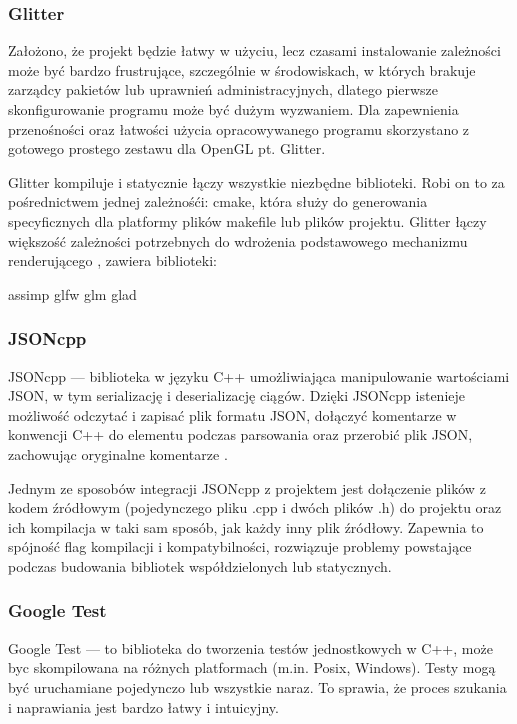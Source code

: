 \subsubsection{Glitter}
Założono, że projekt będzie łatwy w użyciu, lecz czasami instalowanie zależności może być bardzo frustrujące, szczególnie w środowiskach, w których brakuje zarządcy pakietów lub uprawnień administracyjnych, dlatego pierwsze skonfigurowanie programu może być dużym wyzwaniem. Dla zapewnienia przenośności oraz łatwości użycia opracowywanego programu skorzystano z gotowego prostego zestawu dla OpenGL pt. Glitter.

Glitter kompiluje i statycznie łączy wszystkie niezbędne biblioteki. Robi on to za pośrednictwem jednej zależnośći: cmake, która służy do generowania specyficznych dla platformy plików makefile lub plików projektu. Glitter łączy większość zależności potrzebnych do wdrożenia podstawowego mechanizmu renderującego \cite{glitter}, zawiera biblioteki:
\begin{itemize}
\itemi assimp
\itemi glfw
\itemi glm
\itemi glad
\end{itemize}

\subsubsection{JSONcpp}
JSONcpp --- biblioteka w języku C++ umożliwiająca manipulowanie wartościami JSON, w tym serializację i deserializację ciągów. Dzięki JSONcpp istenieje możliwość odczytać i zapisać plik formatu JSON, dołączyć komentarze w konwencji C++ do elementu podczas parsowania oraz przerobić plik JSON, zachowując oryginalne komentarze \cite{jsoncpp}.

Jednym ze sposobów integracji JSONcpp z projektem jest dołączenie plików z kodem źródłowym (pojedynczego pliku .cpp i dwóch plików .h) do projektu oraz ich kompilacja w taki sam sposób, jak każdy inny plik źródłowy. Zapewnia to spójność flag kompilacji i kompatybilności, rozwiązuje problemy powstające podczas budowania bibliotek współdzielonych lub statycznych. 

\subsubsection{Google Test}
Google Test --- to biblioteka do tworzenia testów jednostkowych w C++, może byc skompilowana na różnych platformach (m.in. Posix, Windows). Testy mogą być uruchamiane pojedynczo lub wszystkie naraz. To sprawia, że proces szukania i naprawiania jest bardzo łatwy i intuicyjny\cite{googleTest}.

